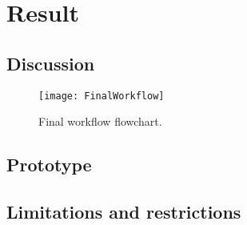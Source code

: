 \section{Result}
\subsection{Discussion}

\begin{figure}[H]
	\centering
	\texttt{[image: FinalWorkflow]}
	\caption{Final workflow flowchart.}
	\label{fig:FinalWorkflow}
\end{figure}

\subsection{Prototype}
\subsection{Limitations and restrictions}